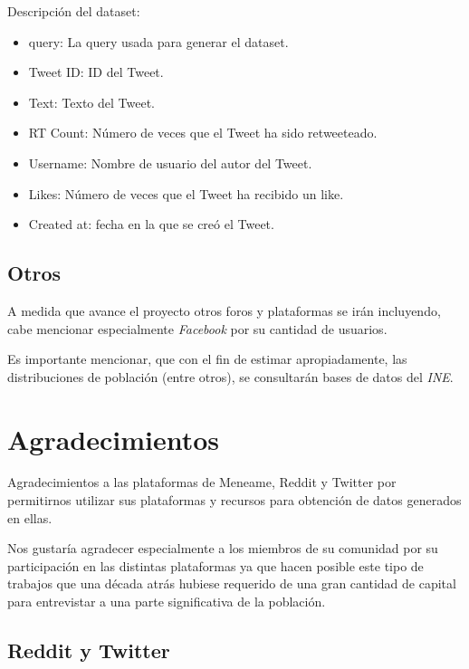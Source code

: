 \documentclass[a4paper,12pt]{article}
\begin{document}
Descripci\'on del dataset:

\begin{itemize}

\item query: La query usada para generar el dataset.

\item Tweet ID: ID del Tweet.

\item Text: Texto del Tweet.

\item RT Count: N\'umero de veces que el Tweet ha sido retweeteado.

\item Username: Nombre de usuario del autor del Tweet.

\item Likes: N\'umero de veces que el Tweet ha recibido un like.

\item Created at: fecha en la que se cre\'o el Tweet.

\end{itemize}

\subsection{Otros}

A medida que avance el proyecto otros foros y plataformas se ir\'an incluyendo, cabe mencionar especialmente {\itshape Facebook} por su cantidad de usuarios.

Es importante mencionar, que con el fin de estimar apropiadamente, las distribuciones de poblaci\'on (entre otros), se consultar\'an bases de datos del {\itshape INE}. 

\section{Agradecimientos}

Agradecimientos a las plataformas de Meneame, Reddit y Twitter por permitirnos utilizar sus plataformas y recursos para obtenci\'on de datos generados en ellas.

Nos gustar\'ia agradecer especialmente a los miembros de su comunidad por su participaci\'on en las distintas plataformas ya que hacen posible este tipo de trabajos que una d\'ecada atr\'as hubiese requerido de una gran cantidad de capital para entrevistar a una parte significativa de la poblaci\'on.

\subsection{Reddit y Twitter}
\end{document}
